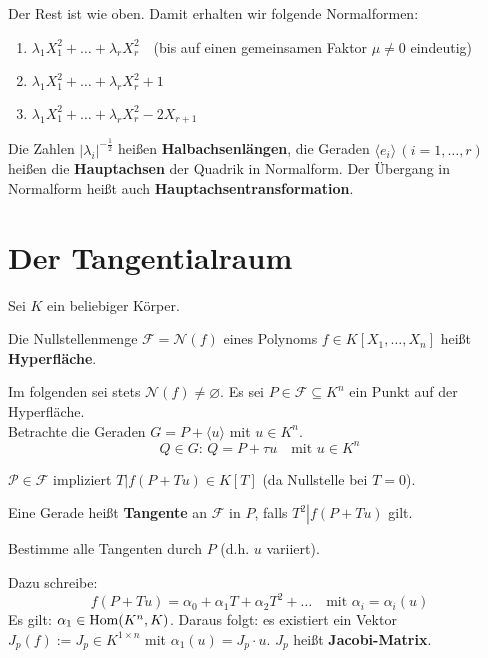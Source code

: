 \documentclass[parskip,a4paper,twoside,DIV15,BCOR12mm]{scrbook}
\begin{document}
Der Rest ist wie oben. Damit erhalten wir folgende Normalformen:
\begin{enumerate}
\item\(\lambda_{1}X_{1}^{2}+\ldots+\lambda_{r}X_{r}^{2}\quad\)(bis auf einen
gemeinsamen Faktor \(\mu\neq0\) eindeutig)
\item\(\lambda_{1}X_{1}^{2}+\ldots+\lambda_{r}X_{r}^{2}+1\)
\item\(\lambda_{1}X_{1}^{2}+\ldots+\lambda_{r}X_{r}^{2}-2X_{r+1}\)
\end{enumerate}
\begin{definition}
Die Zahlen \(\lvert\lambda_{i}\rvert^{-\frac{1}{2}}\) heißen 
\textbf{Halbachsenlängen}, die Geraden \(\langle e_{i}\rangle\,(i=1,\ldots,r)\)
heißen die \textbf{Hauptachsen} der Quadrik in Normalform.
Der \"Ubergang in Normalform heißt auch \textbf{Hauptachsentransformation}.
\end{definition}

\section{Der Tangentialraum}
Sei \(K\) ein beliebiger Körper.
\begin{definition}
Die Nullstellenmenge \(\mathcal{F}=\mathcal{N}(f)\) eines Polynoms
\(f\in K[X_{1},\ldots,X_{n}]\) heißt \textbf{Hyperfläche}.
\end{definition}
Im folgenden sei stets \(\mathcal{N}(f)\neq\varnothing\). Es sei 
\(P\in\mathcal{F}\subseteq K^{n}\) ein Punkt auf der Hyperfläche.\\
Betrachte die Geraden \(G=P+\langle u\rangle\) mit  \(u\in K^{n}\).
\[
Q\in G:\,Q=P+\tau u\quad\text{mit }u\in K^{n}
\]
\begin{note}
\(\mathcal{P}\in\mathcal{F}\) impliziert \(\left.T\right|f(P+Tu)\in K[T]\) (da
Nullstelle bei \(T=0\)).
\end{note}
\begin{definition}
Eine Gerade heißt \textbf{Tangente} an \(\mathcal{F}\) in \(P\), falls
\(\left.T^{2}\right|f(P+Tu)\) gilt.
\end{definition}
\begin{ziel}
Bestimme alle Tangenten durch \(P\) (d.h. \(u\) variiert).
\end{ziel}
Dazu schreibe:
\[
f(P+Tu)=\alpha_{0}+\alpha_{1}T+\alpha_{2}T^{2}+\ldots
    \quad\text{mit }\alpha_{i}=\alpha_{i}(u)
\]
Es gilt: \(\alpha_{1}\in\operatorname{Hom}(K^{n},K)\). Daraus folgt: es existiert ein Vektor
\(J_{p}(f):=J_{p}\in K^{1\times n}\) mit \(\alpha_{1}(u)=J_{p}\cdot u\).
\(J_{p}\) heißt \textbf{Jacobi-Matrix}.
\end{document}
